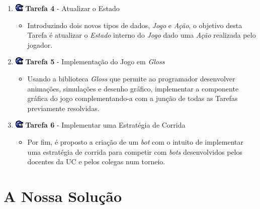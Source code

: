 \documentclass[12pt,a4paper]{report}
\begin{document}
\begin{enumerate}

 \item[]\includegraphics[scale=0.7]{p1.png} \textbf{Tarefa 4} - Atualizar o Estado
 
    \begin{itemize}
    \item Introduzindo dois novos tipos de dados, \textit{Jogo} e \textit{Ação}, o objetivo desta Tarefa é atualizar o \textit{Estado} interno do \textit{Jogo} dado uma \textit{Ação} realizada pelo jogador.
    \end{itemize}
 
 \item[]\includegraphics[scale=0.7]{p1.png} \textbf{Tarefa 5} - Implementação do Jogo em \textit{Gloss}
 
     \begin{itemize}
     \item Usando a biblioteca \textit{Gloss} que permite ao programador desenvolver animações, simulações e desenho gráfico, implementar a componente gráfica do jogo complementando-a com a junção de todas as Tarefas previamente resolvidas.
     \end{itemize}
 
 \item[]\includegraphics[scale=0.7]{p1.png} \textbf{Tarefa 6} - 
Implementar uma Estratégia de Corrida 

     \begin{itemize}
     \item Por fim, é proposto a criação de um \textit{bot} com o intuito de implementar uma estratégia de corrida para competir com \textit{bots} desenvolvidos pelos docentes da UC e pelos colegas num torneio.
     \end{itemize}
      
      
\end{enumerate}


\chapter{A Nossa Solução}
\label{sec:solucao}
 
\end{document}
